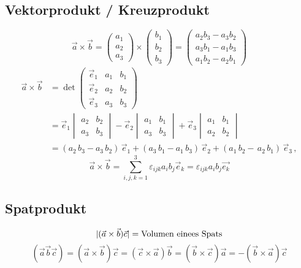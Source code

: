 \documentclass[a4paper]{scrartcl}
\DeclarePairedDelimiter\abs{\lvert}{\rvert}%
\begin{document}
\subsection{Vektorprodukt / Kreuzprodukt}
\label{sec-13-4}
\begin{equation}
\vec{a}\times\vec{b}
=
\begin{pmatrix}a_1 \\ a_2 \\ a_3\end{pmatrix}
\times
\begin{pmatrix}b_1 \\ b_2 \\ b_3 \end{pmatrix}
=
\begin{pmatrix}
a_2b_3 - a_3b_2 \\
a_3b_1 - a_1b_3 \\
a_1b_2 - a_2b_1
\end{pmatrix}
\end{equation}
  \begin{align}
  \vec a \times \vec b &=\det \begin{pmatrix}\vec e_1 & a_1 & b_1 \\ \vec e_2 & a_2 & b_2 \\ \vec e_3 & a_3 & b_3\end{pmatrix}\\
  &= \vec e_1 \begin{vmatrix} a_2 & b_2 \\ a_3 & b_3 \end{vmatrix}
- \vec e_2 \begin{vmatrix} a_1 & b_1 \\ a_3 & b_3 \end{vmatrix}
+ \vec e_3 \begin{vmatrix} a_1 & b_1 \\ a_2 & b_2 \end{vmatrix} \\
&= (a_2 \,b_3 - a_3 \, b_2) \, \vec e_1 + (a_3 \, b_1 - a_1 \, b_3) \, \vec e_2 + (a_1 \, b_2 - \, a_2 \, b_1) \, \vec e_3 \,,
\end{align}
\[\vec{a}\times\vec{b} = \sum_{i,j,k=1}^3 \varepsilon_{ijk} a_i b_j \vec e_k = \varepsilon_{ijk}a_i b_j \vec{e_k}\]
\subsection{Spatprodukt}
\label{sec-13-5}
\[\abs{( \vec{a} \times \vec{b} ) \vec{c}} = \text{Volumen einees Spats}\]
\[(\vec{a}\vec{b}\vec{c})=(\vec{a}\times\vec{b})\vec{c}=(\vec{c}\times\vec{a})\vec{b}=(\vec{b}\times\vec{c})\vec{a}=-(\vec{b}\times\vec{a})\vec{c}\]
\end{document}
